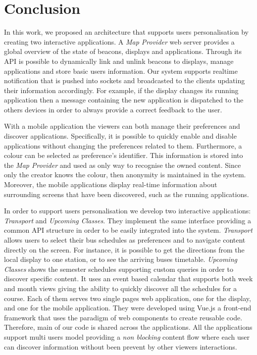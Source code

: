 \documentclass[]{usiinfbachelorproject}
\begin{document}
\section{Conclusion}
In this work, we proposed an architecture that supports users personalisation by creating two interactive applications. A \emph{Map Provider} web server provides a global overview of the state of beacons, displays and applications. Through its API is possible to dynamically link and unlink beacons to displays, manage applications and store basic users information. Our system supports realtime notification that is pushed into sockets and broadcasted to the clients updating their information accordingly. For example, if the display changes its running application then a message containing the new application is dispatched to the others devices in order to always provide a correct feedback to the user.

With a mobile application the viewers can both manage their preferences and discover applications. Specifically, it is possible to quickly enable and disable applications without changing the preferences related to them. Furthermore, a colour can be selected as preference's identifier. This information is stored into the \emph{Map Provider} and used as only way to recognise the owned content. Since only the creator knows the colour, then anonymity is maintained in the system.
Moreover, the mobile applications display real-time information about surrounding screens that have been discovered, such as the running applications.

In order to support users personalisation we develop two interactive applications: \emph{Transport} and \emph{Upcoming Classes}.
They implement the same interface providing a common API structure in order to be easily integrated into the system. 
\emph{Transport} allows users to select their bus schedules as preferences and to navigate content directly on the screen. For instance, it is possible to get the directions from the local display to one station, or to see the arriving buses timetable.
\emph{Upcoming Classes} shows the semester schedules supporting custom queries in order to discover specific content. It uses an event based calendar that supports both week and month views giving the ability to quickly discover all the schedules for a course. Each of them serves two single pages web application, one for the display, and one for the mobile application. They were developed using Vue.js a front-end framework that uses the paradigm of web components to create reusable code. Therefore, main of our code is shared across the applications.
All the applications support multi users model providing a \emph{non blocking} content flow where each user can discover information without been prevent by other viewers interactions. 
\end{document}
